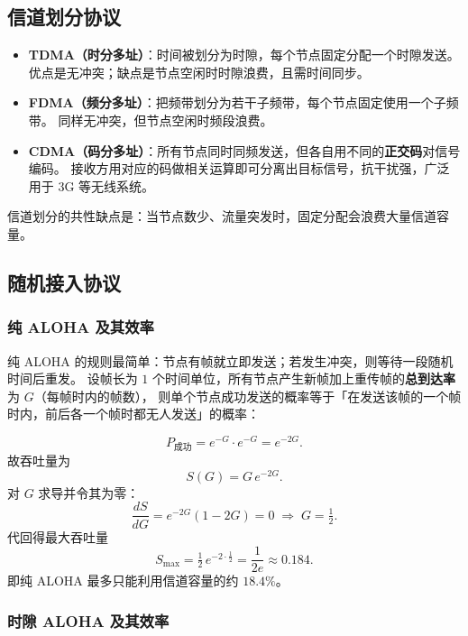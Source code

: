 \subsection{信道划分协议}

\begin{itemize}
    \item \textbf{TDMA（时分多址）}：时间被划分为时隙，每个节点固定分配一个时隙发送。
        优点是无冲突；缺点是节点空闲时时隙浪费，且需时间同步。
    \item \textbf{FDMA（频分多址）}：把频带划分为若干子频带，每个节点固定使用一个子频带。
        同样无冲突，但节点空闲时频段浪费。
    \item \textbf{CDMA（码分多址）}：所有节点同时同频发送，但各自用不同的\textbf{正交码}对信号编码。
        接收方用对应的码做相关运算即可分离出目标信号，抗干扰强，广泛用于 3G 等无线系统。
\end{itemize}

信道划分的共性缺点是：当节点数少、流量突发时，固定分配会浪费大量信道容量。

\subsection{随机接入协议}

\subsubsection{纯 ALOHA 及其效率}

纯 ALOHA 的规则最简单：节点有帧就立即发送；若发生冲突，则等待一段随机时间后重发。
设帧长为 $1$ 个时间单位，所有节点产生新帧加上重传帧的\textbf{总到达率}为 $G$（每帧时内的帧数），
则单个节点成功发送的概率等于「在发送该帧的一个帧时内，前后各一个帧时都无人发送」的概率：

\begin{equation}
    P_{\text{成功}} = e^{-G}\cdot e^{-G} = e^{-2G}.
\end{equation}
故吞吐量为
\begin{equation}
    S(G) = G\,e^{-2G}.
\end{equation}
对 $G$ 求导并令其为零：
\[
\frac{dS}{dG} = e^{-2G}(1-2G) = 0 \;\Rightarrow\; G = \tfrac{1}{2}.
\]
代回得最大吞吐量
\begin{equation}
    S_{\max} = \tfrac{1}{2}\,e^{-2\cdot\frac12} = \frac{1}{2e} \approx 0.184.
    \label{eq:aloha_pure}
\end{equation}
即纯 ALOHA 最多只能利用信道容量的约 $18.4\%$。

\subsubsection{时隙 ALOHA 及其效率}

